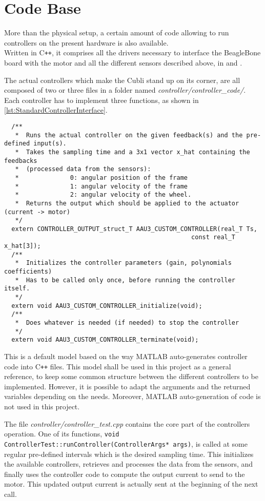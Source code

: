 \section{Code Base}\label{sec:codeBase}
More than the physical setup, a certain amount of code allowing to run controllers on the present hardware is also available. \\
Written in C\texttt{++}, it comprises all the drivers necessary to interface the BeagleBone board with the motor and all the different sensors described above, in  and .

The actual controllers which make the Cubli stand up on its corner, are all composed of two or three files in a folder named \textit{controller/controller\_code/}. Each controller has to implement three functions, as shown in \autoref{lst:StandardControllerInterface}.
%
\begin{lstlisting}
  /**
   *  Runs the actual controller on the given feedback(s) and the pre-defined input(s).
   *  Takes the sampling time and a 3x1 vector x_hat containing the feedbacks 
   *  (processed data from the sensors):
   *              0: angular position of the frame
   *              1: angular velocity of the frame
   *              2: angular velocity of the wheel.
   *  Returns the output which should be applied to the actuator (current -> motor)
   */
  extern CONTROLLER_OUTPUT_struct_T AAU3_CUSTOM_CONTROLLER(real_T Ts, 
                                                   const real_T x_hat[3]);
  /**
   *  Initializes the controller parameters (gain, polynomials coefficients)
   *  Has to be called only once, before running the controller itself.
   */
  extern void AAU3_CUSTOM_CONTROLLER_initialize(void);
  /**
   *  Does whatever is needed (if needed) to stop the controller
   */
  extern void AAU3_CUSTOM_CONTROLLER_terminate(void);

\end{lstlisting}
This is a default model based on the way MATLAB auto-generates controller code into C\texttt{++} files. This model shall be used in this project as a general reference, to keep some common structure between the different controllers to be implemented. However, it is possible to adapt the arguments and the returned variables depending on the needs. Moreover, MATLAB auto-generation of code is not used in this project.

The file \textit{controller/controller\_test.cpp} contains the core part of the controllers operation. One of its functions, \lstinline{void ControllerTest::runController(ControllerArgs* args)}, is called at some regular pre-defined intervals which is the desired sampling time. This initializes the available controllers, retrieves and processes the data from the sensors, and finally uses the controller code to compute the output current to send to the motor. This updated output current is actually sent at the beginning of the next call.

